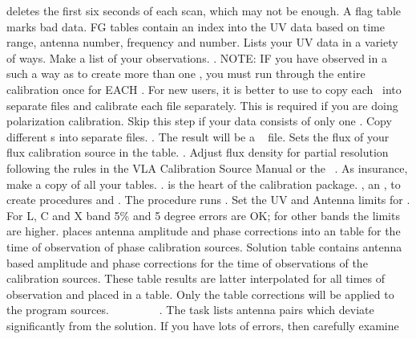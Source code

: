 deletes the first six seconds of each scan, which may not be enough.
\tablestyle
\beddes
{} A flag table marks bad data. FG tables contain an index
into the UV data based on time range, antenna number, frequency and
\IF number.
\eeddes
\normalstyle
{} Lists your UV data in a variety of ways.  Make a list
of your observations.
.
NOTE: IF you have observed in a such a way as to create more than one
\FREQID,  you must run through the entire calibration
once for EACH \FREQID.
For new users, it is better to use  to copy each
\FREQID\ into separate files and calibrate each file separately.  This
is required if you are doing polarization calibration.
 Skip this step if your data consists of only one
   \FREQID. Copy different \FREQID s into separate files.
.
The result will be a ~ file.
 Sets the flux of your flux calibration source in
the \SU table.
.
Adjust flux density for partial resolution following the rules in the
VLA Calibration Source Manual or the \AIPS\ \COOKBOOK.
 As insurance, make a copy of all your tables.
.
  is the heart of the \AIPS calibration
package.  , an , to create
procedures  and .
The procedure  runs .  Set the UV and
Antenna limits for \TCTES.  For L, C and X band 5\% and 5 degree
errors are OK; for other bands the limits are higher.  
places antenna amplitude and phase corrections into an \SN table for
the time of observation of phase calibration sources.
\tablestyle
\beddes
{} Solution table contains antenna based amplitude and phase
corrections for the time of observations of the calibration sources.
These \SN table results are latter interpolated for all times of
observation and placed in a \CL table.  Only the \CL table corrections
will be applied to the program sources.
\eeddes
\normalstyle
{}~ ~
~ ~
~
.
The task  lists antenna pairs which deviate significantly
from the solution.  If you have lots of errors, then carefully examine
